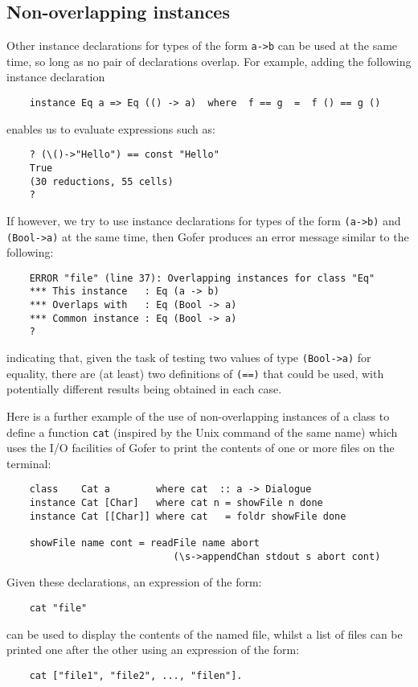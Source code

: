 \subsection{Non-overlapping instances}
Other instance declarations for types of the form \verb"a->b" can be used at
the same time, so  long  as  no  pair  of  declarations  overlap.   For
example, adding the following instance declaration
\begin{verbatim}
    instance Eq a => Eq (() -> a)  where  f == g  =  f () == g ()
\end{verbatim}
enables us to evaluate expressions such as:
\begin{verbatim}
    ? (\()->"Hello") == const "Hello"
    True
    (30 reductions, 55 cells)
    ? 
\end{verbatim}
If however, we try to use instance declarations for types of the  form
\verb"(a->b)" and \verb"(Bool->a)" 
at the same time, then Gofer produces an error
message similar to the following:
\begin{verbatim}
    ERROR "file" (line 37): Overlapping instances for class "Eq"
    *** This instance   : Eq (a -> b)
    *** Overlaps with   : Eq (Bool -> a)
    *** Common instance : Eq (Bool -> a)
    ? 
\end{verbatim}
indicating that, given the task of testing two values of type \verb"(Bool->a)"
for equality, there are (at least) two definitions of \verb"(==)"  that  could
be used, with potentially different  results  being  obtained  in  each
case.

Here is a further example of the use of non-overlapping instances of  a
class to define a function \verb"cat" (inspired by the Unix  command  of
the same name) which uses the I/O facilities  of  Gofer  to  print  the
contents of one or more files on the terminal:
\begin{verbatim}
    class    Cat a        where cat  :: a -> Dialogue
    instance Cat [Char]   where cat n = showFile n done
    instance Cat [[Char]] where cat   = foldr showFile done

    showFile name cont = readFile name abort
                             (\s->appendChan stdout s abort cont)
\end{verbatim} 
Given these declarations, an expression of the form:
\begin{verbatim}
    cat "file"
\end{verbatim}
can be used to display the contents of the named file, whilst a list of
files can be printed one after the other using  an  expression  of  the
form:
\begin{verbatim}
    cat ["file1", "file2", ..., "filen"].
\end{verbatim}


